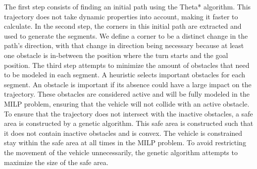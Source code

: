 The first step consists of finding an initial path using the Theta* algorithm. This trajectory does not take dynamic properties into account, making it faster to calculate. In the second step, the corners in this initial path are extracted and used to generate the segments. We define a corner to be a distinct change in the path's direction, with that change in direction being necessary because at least one obstacle is in-between the position where the turn starts and the goal position. The third step attempts to minimize the amount of obstacles that need to be modeled in each segment. A heuristic selects important obstacles for each segment. An obstacle is important if its absence could have a large impact on the trajectory. These obstacles are considered active and will be fully modeled in the MILP problem, ensuring that the vehicle will not collide with an active obstacle.\\ 
To ensure that the trajectory does not intersect with the inactive obstacles, a safe area is constructed by a genetic algorithm. This safe area is constructed such that it does not contain inactive obstacles and is convex. The vehicle is constrained stay within the safe area at all times in the MILP problem. To avoid restricting the movement of the vehicle unnecessarily, the genetic algorithm attempts to maximize the size of the safe area.\\

